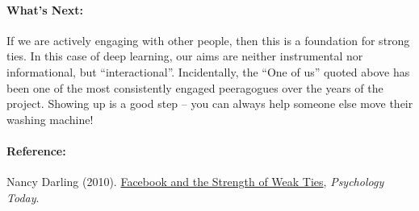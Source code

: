 \paragraph{What's Next:} If we are actively engaging with other people,
then this is a foundation for strong ties. In this case of deep
learning, our aims are neither instrumental nor informational, but
``interactional''. Incidentally, the ``One of us'' quoted above has been
one of the most consistently engaged peeragogues over the years of the
project. Showing up is a good step -- you can always help someone else
move their washing machine!

\paragraph{Reference:}

Nancy Darling (2010).
\href{http://www.psychologytoday.com/blog/thinking-about-kids/201005/facebook-and-the-strength-weak-ties}{Facebook
and the Strength of Weak Ties}, \emph{Psychology Today}.

